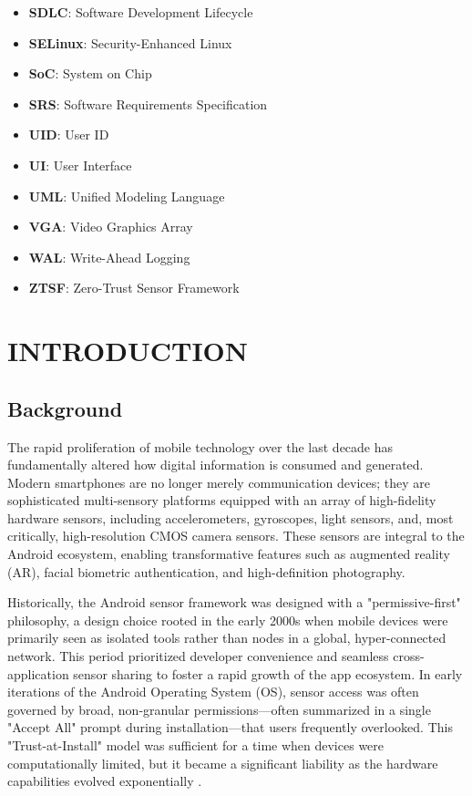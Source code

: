 \documentclass[12pt,a4paper]{report}
\renewcommand{\cftchapdotsep}{\cftdotsep}
\begin{document}
\begin{itemize}
        \item \textbf{SDLC}: Software Development Lifecycle
        \item \textbf{SELinux}: Security-Enhanced Linux
        \item \textbf{SoC}: System on Chip
        \item \textbf{SRS}: Software Requirements Specification
        \item \textbf{UID}: User ID
        \item \textbf{UI}: User Interface
        \item \textbf{UML}: Unified Modeling Language
        \item \textbf{VGA}: Video Graphics Array
        \item \textbf{WAL}: Write-Ahead Logging
        \item \textbf{ZTSF}: Zero-Trust Sensor Framework
    \end{itemize}

    \clearpage
    \pagestyle{fancy}
    \addtocontents{toc}{\protect\renewcommand{\protect\cftchapleader}{\protect\cftdotfill{\cftchapdotsep}}}
    \chapter{INTRODUCTION}

    \section{Background}
    The rapid proliferation of mobile technology over the last decade has fundamentally altered how digital information is consumed and generated. Modern smartphones are no longer merely communication devices; they are sophisticated multi-sensory platforms equipped with an array of high-fidelity hardware sensors, including accelerometers, gyroscopes, light sensors, and, most critically, high-resolution CMOS camera sensors. These sensors are integral to the Android ecosystem, enabling transformative features such as augmented reality (AR), facial biometric authentication, and high-definition photography.

    Historically, the Android sensor framework was designed with a "permissive-first" philosophy, a design choice rooted in the early 2000s when mobile devices were primarily seen as isolated tools rather than nodes in a global, hyper-connected network. This period prioritized developer convenience and seamless cross-application sensor sharing to foster a rapid growth of the app ecosystem. In early iterations of the Android Operating System (OS), sensor access was often governed by broad, non-granular permissions—often summarized in a single "Accept All" prompt during installation—that users frequently overlooked. This "Trust-at-Install" model was sufficient for a time when devices were computationally limited, but it became a significant liability as the hardware capabilities evolved exponentially \cite{malwaresurvey}.
\end{document}
